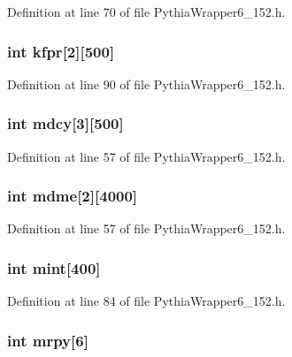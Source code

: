 Definition at line 70 of file Pythia\-Wrapper6\_\-152.h.
\subsubsection{\setlength{\rightskip}{0pt plus 5cm}int {\bf kfpr}[2][500]}\label{PythiaWrapper6__152_8h_9b7aa041e3a8a76f368d437881a669b1}




Definition at line 90 of file Pythia\-Wrapper6\_\-152.h.
\subsubsection{\setlength{\rightskip}{0pt plus 5cm}int {\bf mdcy}[3][500]}\label{PythiaWrapper6__152_8h_686748450c8a9b369f6b7d6cb19b6de6}




Definition at line 57 of file Pythia\-Wrapper6\_\-152.h.
\subsubsection{\setlength{\rightskip}{0pt plus 5cm}int {\bf mdme}[2][4000]}\label{PythiaWrapper6__152_8h_49fa69f053c0d51c9d5411a0fa0dceeb}




Definition at line 57 of file Pythia\-Wrapper6\_\-152.h.
\subsubsection{\setlength{\rightskip}{0pt plus 5cm}int {\bf mint}[400]}\label{PythiaWrapper6__152_8h_79d56c63372bdf9b19fbb5fb47fe0c10}




Definition at line 84 of file Pythia\-Wrapper6\_\-152.h.
\subsubsection{\setlength{\rightskip}{0pt plus 5cm}int {\bf mrpy}[6]}\label{PythiaWrapper6__152_8h_ae3607e3caed79fa09cf79970779987a}




